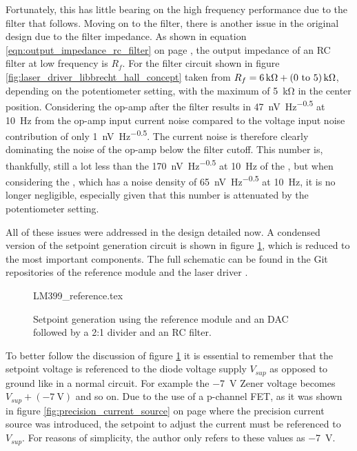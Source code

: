 Fortunately, this has little bearing on the high frequency performance due to the filter that follows. Moving on to the filter, there is another issue in the original design due to the filter impedance. As shown in equation \ref{eqn:output_impedance_rc_filter} on page \pageref{eqn:output_impedance_rc_filter}, the output impedance of an RC filter at low frequency is $R_{f}$. For the filter circuit shown in figure \ref{fig:laser_driver_libbrecht_hall_concept} taken from \cite{libbrecht_hall} $R_{f} = \qty{6}{\kilo\ohm} + \qtyrange[range-units = bracket, range-phrase=\textup{~to~}]{0}{5}{\kilo\ohm}$, depending on the potentiometer setting, with the maximum of \qty{5}{\kilo \ohm} in the center position. Considering the  op-amp after the filter results in \qty[power-half-as-sqrt]{47}{\nV \per \Hz\tothe{0.5}} at \qty{10}{\Hz} from the op-amp input current noise compared to the voltage input noise contribution of only \qty[power-half-as-sqrt]{1}{\nV \per \Hz\tothe{0.5}}. The current noise is therefore clearly dominating the noise of the op-amp below the filter cutoff. This number is, thankfully, still a lot less than the \qty[power-half-as-sqrt]{170}{\nV \per \Hz\tothe{0.5}} at \qty{10}{\Hz} of the , but when considering the , which has a noise density of \qty[power-half-as-sqrt]{65}{\nV \per \Hz\tothe{0.5}} at \qty{10}{\Hz}, it is no longer negligible, especially given that this number is attenuated by the potentiometer setting.

All of these issues were addressed in the design detailed now. A condensed version of the setpoint generation circuit is shown in figure \ref{fig:dgDrive_setpoint_generation}, which is reduced to the most important components. The full schematic can be found in the Git repositories of the reference module and the laser driver \cite{git_dgDrive,git_dgDrive_reference}.
\begin{figure}[ht]
    \centering
        {LM399_reference.tex}
    \caption{Setpoint generation using the  reference module and an  DAC followed by a 2:1 divider and an RC filter.}
    \label{fig:dgDrive_setpoint_generation}
\end{figure}

To better follow the discussion of figure \ref{fig:dgDrive_setpoint_generation} it is essential to remember that the setpoint voltage is referenced to the diode voltage supply $V_{sup}$ as opposed to ground like in a normal circuit. For example the \qty{-7}{\V} Zener voltage becomes $V_{sup} + (\qty{-7}{\V})$ and so on. Due to the use of a p-channel FET, as it was shown in figure \ref{fig:precision_current_source} on page \pageref{fig:precision_current_source} where the precision current source was introduced, the setpoint to adjust the current must be referenced to $V_{sup}$. For reasons of simplicity, the author only refers to these values as \qty{-7}{\V}.

